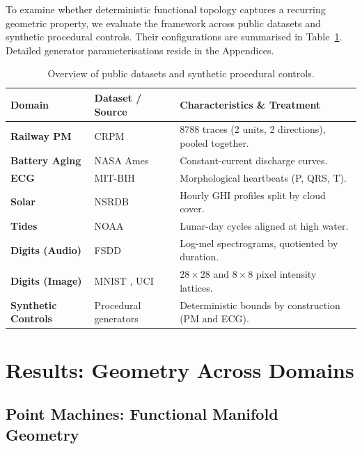 \documentclass[10pt]{article}
\theoremstyle{plain}
\theoremstyle{definition}
\theoremstyle{remark}
\begin{document}
To examine whether deterministic functional topology captures a recurring geometric property, we evaluate the framework across public datasets and synthetic procedural controls. Their configurations are summarised in Table~\ref{tab:datasets_summary}. Detailed generator parameterisations reside in the Appendices.

\begin{table}[ht]
\centering
\small
\begin{tabular}{p{3cm} p{4cm} p{7cm}}
\toprule
\textbf{Domain} & \textbf{Dataset / Source} & \textbf{Characteristics \& Treatment} \\
\midrule
\textbf{Railway PM} & CRPM \citep{li2020pointmachine} & 8788 traces (2 units, 2 directions), pooled together. \\
\textbf{Battery Aging} & NASA Ames \citep{saha2007prognostics} & Constant-current discharge curves. \\
\textbf{ECG} & MIT-BIH \citep{MITBIH_dataset_1980} & Morphological heartbeats (P, QRS, T). \\
\textbf{Solar} & NSRDB \citep{sengupta2018nsrdb} & Hourly GHI profiles split by cloud cover. \\
\textbf{Tides} & NOAA \citep{noaa_coops_tidescurrents} & Lunar-day cycles aligned at high water. \\
\textbf{Digits (Audio)} & FSDD \citep{fsdd} & Log-mel spectrograms, quotiented by duration. \\
\textbf{Digits (Image)} & MNIST \citep{lecun1998mnist}, UCI \citep{uci_optdigits} & $28\times 28$ and $8\times 8$ pixel intensity lattices. \\
\textbf{Synthetic Controls} & Procedural generators & Deterministic bounds by construction (PM and ECG). \\
\bottomrule
\end{tabular}
\caption{Overview of public datasets and synthetic procedural controls.}
\label{tab:datasets_summary}
\end{table}

\section{Results: Geometry Across Domains}
\label{sec:results}

\subsection{Point Machines: Functional Manifold Geometry}
\end{document}
